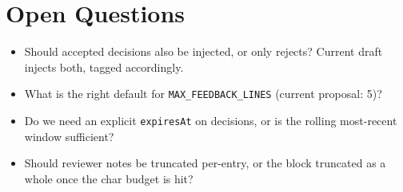 \section{Open Questions}
\begin{itemize}[leftmargin=1.2em]
  \item Should accepted decisions also be injected, or only rejects? Current draft injects both, tagged accordingly.
  \item What is the right default for \texttt{MAX\_FEEDBACK\_LINES} (current proposal: 5)?
  \item Do we need an explicit \texttt{expiresAt} on decisions, or is the rolling most-recent window sufficient?
  \item Should reviewer notes be truncated per-entry, or the block truncated as a whole once the char budget is hit?
\end{itemize}



